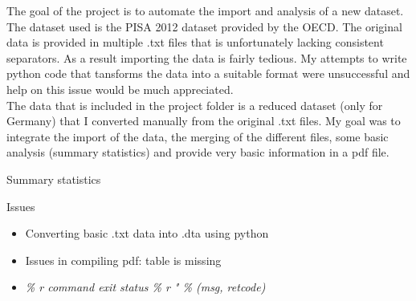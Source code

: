 \documentclass{beamer}
\begin{document}
\begin{frame}
The goal of the project is to automate the import and analysis of a new dataset. The dataset used is the PISA 2012 dataset provided by the OECD. The original data is provided in multiple .txt files that is unfortunately lacking consistent separators. As a result importing the data is fairly tedious. My attempts to write python code that tansforms the data into a suitable format were unsuccessful and help on this issue would be much appreciated. \\ 
The data that is included in the project folder is a reduced dataset (only for Germany) that I converted manually from the original .txt files. My goal was to integrate the import of the data, the merging of the different files, some basic analysis (summary statistics) and provide very basic information in a pdf file. 
\end{frame}

\begin{frame}{Summary statistics}
\begin{center}

\end{center}

\end{frame}

\begin{frame}{Issues}
\begin{itemize}
\item Converting basic .txt data into .dta using python
\item Issues in compiling pdf: table is missing
\item \textit{\% r command exit status \% r " \% (msg, retcode)}
\end{itemize}

\end{frame}
\end{document}
